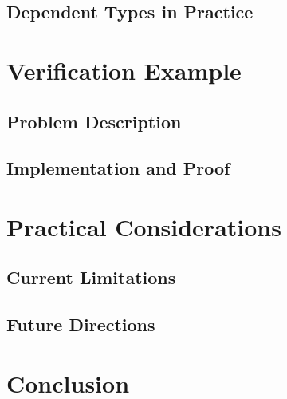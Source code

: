 \documentclass[]{rptuseminar}
\begin{document}
\subsection{Dependent Types in Practice}  
\label{subsec:dependent-types}  

\section{Verification Example}  
\label{sec:verification-example}  
\subsection{Problem Description}  
\label{subsec:problem-desc}  

\subsection{Implementation and Proof}  
\label{subsec:implementation}  

\section{Practical Considerations}  
\label{sec:practical-considerations}  
\subsection{Current Limitations}  
\label{subsec:limitations}  

\subsection{Future Directions}  
\label{subsec:future}  

\section{Conclusion}  
\label{sec:conclusion}  

\newpage
\nocite{*}



\end{document}
